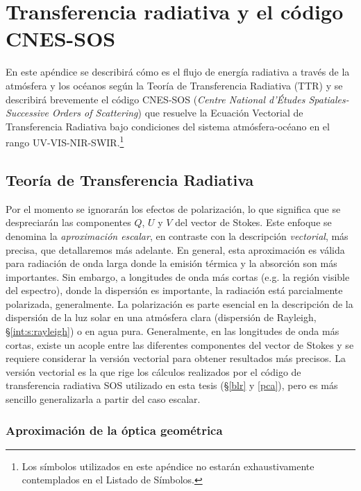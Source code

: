 \chapter{Transferencia radiativa y el código CNES-SOS}
\label{sos}


En este apéndice se describirá cómo es el flujo de energía radiativa a través de la atmósfera y los océanos según la Teoría de Transferencia Radiativa (TTR) y se describirá brevemente el código CNES-SOS (\textit{Centre National d'Études Spatiales-Successive Orders of Scattering}) que resuelve la Ecuación Vectorial de Transferencia Radiativa bajo condiciones del sistema atmósfera-océano en el rango UV-VIS-NIR-SWIR.\footnote{Los símbolos utilizados en este apéndice no estarán exhaustivamente contemplados en el Listado de Símbolos.}

\section{Teoría de Transferencia Radiativa}
\label{sos:s:ttr}

    Por el momento se ignorarán los efectos de polarización, lo que significa que se despreciarán las componentes $Q$, $U$ y $V$ del vector de Stokes. Este enfoque se denomina la \textit{aproximación escalar}, en contraste con la descripción \textit{vectorial}, más precisa, que detallaremos más adelante. En general, esta aproximación es válida para radiación de onda larga donde la emisión térmica y la absorción son más importantes. Sin embargo, a longitudes de onda más cortas (e.g. la región visible del espectro), donde la dispersión es importante, la radiación está parcialmente polarizada, generalmente. La polarización es parte esencial en la descripción de la dispersión de la luz solar en una atmósfera clara  (dispersión de Rayleigh, \S \ref{int:s:rayleigh}) o en agua pura. Generalmente, en las longitudes de onda más cortas, existe un acople entre las diferentes componentes del vector de Stokes y se requiere considerar la versión vectorial para obtener resultados más precisos. La versión vectorial es la que rige los cálculos realizados por el código de transferencia radiativa SOS utilizado en esta tesis (\S \ref{blr} y \ref{pca}), pero es más sencillo generalizarla a partir del caso escalar.

    \subsection{Aproximación de la óptica geométrica}
    \label{sos:s:geometrica}

